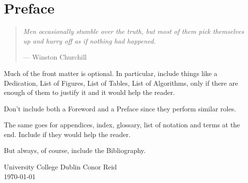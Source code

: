 %
%
%
%

\chapter*{Preface}


\begin{quote}
\noindent\textit{Men occasionally stumble over the truth, but most of them pick themselves up and
hurry off as if nothing had happened.}

\hspace{2cm}--- Winston Churchill
\end{quote}

Much of the front matter is optional. In particular, include things like a Dedication, List of Figures, List of Tables, List of Algorithms, only if there are enough of them to justify it and it would help the reader.

Don't include both a Foreword and a Preface since they perform similar roles.

The same goes for appendices, index, glossary, list of notation and terms at the end. Include if they would help the reader.

But always, of course, include the Bibliography.

\vspace{2em}

University College Dublin \hfill Conor Reid \\
\today 